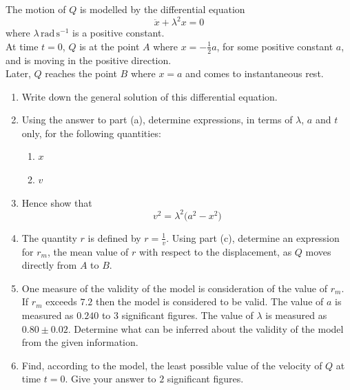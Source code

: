 \documentclass[leqno]{article}
\begin{document}
\begin{enumerate}[
  label=\textbf{\arabic*.},
  leftmargin=*,
  topsep=0pt,
  partopsep=0pt,
  parsep=0pt
]
The motion of $Q$ is modelled by the differential equation \[\ddot{x}+\lambda^2 x=0\] where $\lambda\,\mathrm{rad\,s^{-1}}$ is a positive constant. \\

At time $t=0$, $Q$ is at the point $A$ where $x=-\tfrac{1}{2}a$, for some positive constant $a$, and is moving in the positive direction. \\

Later, $Q$ reaches the point $B$ where $x=a$ and comes to instantaneous rest. \\
\begin{enumerate}[label=\textbf{(\alph*)}]
  \item Write down the general solution of this differential equation. 
  \item Using the answer to part (a), determine expressions, in terms of $\lambda$, $a$ and $t$ only, for the following quantities:
  \begin{enumerate}[label=(\roman*)]
    \item $x$
    \item $v$
  \end{enumerate}
  \item Hence show that
  \[ v^2=\lambda^2\bigl(a^2-x^2\bigr) \]
  \item The quantity $r$ is defined by $r=\frac{1}{v}$. Using part (c), determine an expression for $r_m$, the mean value of $r$ with respect to the displacement, as $Q$ moves directly from $A$ to $B$. 
  \item One measure of the validity of the model is consideration of the value of $r_m$. If $r_m$ exceeds $7.2$ then the model is considered to be valid. The value of $a$ is measured as $0.240$ to $3$ significant figures. The value of $\lambda$ is measured as $0.80\pm 0.02$. Determine what can be inferred about the validity of the model from the given information. 
  \item Find, according to the model, the least possible value of the velocity of $Q$ at time $t=0$. Give your answer to $2$ significant figures. 
\end{enumerate}

\end{enumerate}
\end{document}
